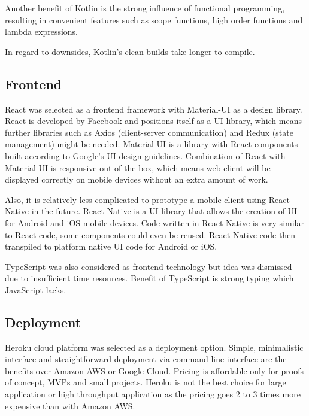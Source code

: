 Another benefit of Kotlin is the strong influence of functional programming,
resulting in convenient features such as scope functions, high order functions and lambda expressions.

In regard to downsides, Kotlin's clean builds take longer to compile.\cite{kotlin-compile}

\subsection{Frontend}\label{subsec:ts-frontend}

React was selected as a frontend framework with Material-UI as a design library.\cite{react, material}
React is developed by Facebook and positions itself as a UI library, which means further libraries
such as Axios (client-server communication) and Redux (state management) might be needed.\cite{axios, redux}
Material-UI is a library with React components built according to Google's UI design guidelines.
Combination of React with Material-UI is responsive out of the box, which means web client will be displayed
correctly on mobile devices without an extra amount of work.

Also, it is relatively less complicated to prototype a mobile client using React Native in the future.\cite{react-native}
React Native is a UI library that allows the creation of UI for Android and iOS mobile devices.
Code written in React Native is very similar to React code, some components could even be reused.
React Native code then transpiled to platform native UI code for Android or iOS\@.

TypeScript was also considered as frontend technology but idea was dismissed due to insufficient time resources.
Benefit of TypeScript is strong typing which JavaScript lacks.\cite{typescript}

\subsection{Deployment}\label{subsec:ts-deployment}

Heroku cloud platform was selected as a deployment option.\cite{heroku}
Simple, minimalistic interface and straightforward deployment via command-line interface are the benefits over Amazon AWS or Google Cloud.
Pricing is affordable only for proofs of concept, MVPs and small projects.
Heroku is not the best choice for large application or high throughput application as the pricing goes 2 to 3
times more expensive than with Amazon AWS.\cite{heroku-vs-aws}
